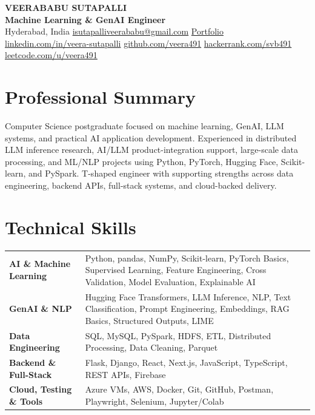 \documentclass[10pt,a4paper]{article}
\begin{document}
\begin{center}
    {\LARGE \textbf{VEERABABU SUTAPALLI}}\\[6pt]
    {\normalsize \textbf{Machine Learning \& GenAI Engineer}}\\[3pt]
    Hyderabad, India \textbar{}
    \href{mailto:isutapalliveerababu@gmail.com}{isutapalliveerababu@gmail.com} \textbar{}
    \href{https://veerababu-sutapalli-portfolio.vercel.app/}{Portfolio}\\[2pt]
    \href{https://www.linkedin.com/in/veera-sutapalli}{linkedin.com/in/veera-sutapalli} \textbar{}
    \href{https://github.com/veera491}{github.com/veera491} \textbar{}
    \href{https://www.hackerrank.com/svb491}{hackerrank.com/svb491} \textbar{}
    \href{https://leetcode.com/u/veera491/}{leetcode.com/u/veera491}
\end{center}

\vspace{-6pt}

\section{Professional Summary}
Computer Science postgraduate focused on machine learning, GenAI, LLM systems, and practical AI application development. Experienced in distributed LLM inference research, AI/LLM product-integration support, large-scale data processing, and ML/NLP projects using Python, PyTorch, Hugging Face, Scikit-learn, and PySpark. T-shaped engineer with supporting strengths across data engineering, backend APIs, full-stack systems, and cloud-backed delivery.

\section{Technical Skills}
\begin{tabularx}{\textwidth}{>{\bfseries}p{3.6cm} X}
AI \& Machine Learning & Python, pandas, NumPy, Scikit-learn, PyTorch Basics, Supervised Learning, Feature Engineering, Cross Validation, Model Evaluation, Explainable AI \\
GenAI \& NLP & Hugging Face Transformers, LLM Inference, NLP, Text Classification, Prompt Engineering, Embeddings, RAG Basics, Structured Outputs, LIME \\
Data Engineering & SQL, MySQL, PySpark, HDFS, ETL, Distributed Processing, Data Cleaning, Parquet \\
Backend \& Full-Stack & Flask, Django, React, Next.js, JavaScript, TypeScript, REST APIs, Firebase \\
Cloud, Testing \& Tools & Azure VMs, AWS, Docker, Git, GitHub, Postman, Playwright, Selenium, Jupyter/Colab \\
\end{tabularx}
\end{document}
